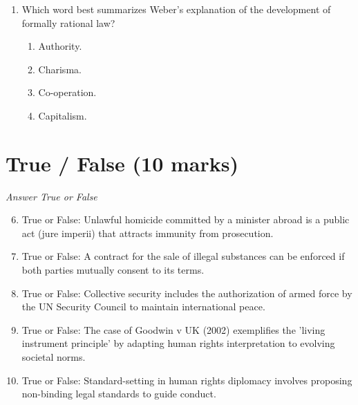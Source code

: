\documentclass[12pt]{article}
\begin{document}
\begin{enumerate}[label=\arabic*.]
\begin{enumerate}[label=(\alph*)]
    \item That there is no distinction between law and morality.
    \item That there is a distinction between right and wrong.
    \item That facts about the world or human nature cannot normally ordain what ought to be
    \item That human rights are fundamentally unsound.
\end{enumerate}
\item Which word best summarizes Weber's explanation of the development of formally rational law?
\begin{enumerate}[label=(\alph*)]
    \item Authority.
    \item Charisma.
    \item Co-operation.
    \item Capitalism.
\end{enumerate}
\end{enumerate}

\section*{True / False (10 marks)}
\textit{Answer True or False}
\begin{enumerate}[label=\arabic*.]
\setcounter{enumi}{5}
\item True or False: Unlawful homicide committed by a minister abroad is a public act (jure imperii) that attracts immunity from prosecution.
\item True or False: A contract for the sale of illegal substances can be enforced if both parties mutually consent to its terms.
\item True or False: Collective security includes the authorization of armed force by the UN Security Council to maintain international peace.
\item True or False: The case of Goodwin v UK (2002) exemplifies the 'living instrument principle' by adapting human rights interpretation to evolving societal norms.
\item True or False: Standard-setting in human rights diplomacy involves proposing non-binding legal standards to guide conduct.
\end{enumerate}
\end{document}
